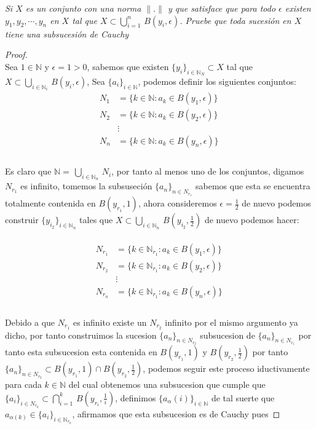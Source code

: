 \documentclass[11pt,letterpaper]{article}
\newcommand{\N}{\mathbb{N}}
\begin{document}
\begin{tcolorbox}[
	title = \textcolor{black}{\textcolor{white}{Problema 3}},]
\textit{Si $X$ es un conjunto con una norma $\|.\|$ y que satisface que para todo $\epsilon$ existen $y_1,y_2,\cdots, y_n$
en $X$ tal que $X\subset \displaystyle\bigcup_{i=1}^{n}\,B(y_i,\epsilon)$. Pruebe que toda sucesi\'on en $X$ tiene una subsucesi\'on de Cauchy}
\end{tcolorbox}
\begin{proof}\,\\
    Sea $1\in \N$ y $\epsilon=1>0$, sabemos que existen $\{y_i\}_{i\in \N_N}\subset X$ tal que $X\subset\displaystyle\bigcup_{i\in \N_i}\,B(y_i,\epsilon)$, Sea
    $\{a_i\}_{i\in \N}$, podemos definir los siguientes conjuntos:\,\\
    \begin{align*}
        N_{1}&=\{k \in \N:a_k\in B(y_1,\epsilon)\}\,\\
        N_{2}&=\{k\in \N:a_k\in B(y_2,\epsilon)\}\,\\
        &\vdots\,\\
        N_{n}&=\{k \in \N:a_k\in B(y_n,\epsilon)\}\,\\
    \end{align*}\,\\
    Es claro que $\N=\displaystyle\,\bigcup_{i\in \N_n}\,N_i$, por tanto al menos uno de los conjuntos, digamos $N_{r_1}$ es infinito, tomemos la subsuseci\'on $\{a_n\}_{n\in N_{r_1}}$ sabemos que esta se encuentra totalmente contenida en $B(y_{r_1},1)$, ahora consideremos $\epsilon=\frac{1}{2}$ de nuevo podemos construir $\{y_{i_2}\}_{i\in \N_n}$ tales que $X\subset \displaystyle \bigcup_{i\in \N_n}\,B\left(y_{i_2},\frac{1}{2}\right)$ de nuevo podemos hacer:\,\\
    \,\\
     \begin{align*}
        N_{r_1}&=\{k \in \N_{r_1}:a_k\in B(y_1,\epsilon)\}\,\\
        N_{r_2}&=\{k\in \N_{r_1}:a_k\in B(y_2,\epsilon)\}\,\\
        &\vdots\,\\
        N_{r_n}&=\{k \in \N_{r_1}:a_k\in B(y_n,\epsilon)\}\,\\
    \end{align*}\,\\
    Debido a que $N_{r_1}$ es infinito existe un $N_{r_2}$ infinito por el mismo argumento ya dicho, por tanto construimos la sucesion $\{a_n\}_{n\in N_{r_2}}$ subsucesion de $\{a_n\}_{n\in N_{r_1}}$ por tanto esta subsucesion esta contenida en $B(y_{r_1},1)$ y $B\left(y_{r_2},\frac{1}{2}\right)$ por tanto $\{a_n\}_{n\in N_{r_2}}\subset B(y_{r_1},1)\cap B\left(y_{r_2},\frac{1}{2}\right)$, podemos seguir este proceso iductivamente para cada $k\in \N$ del cual obtenemos una subsucesion que cumple que $\{a_{i}\}_{i\in N_{r_k}}\subset\bigcap_{i=1}^{k}\,B\left(y_{r_i},\frac{1}{i}\right)$, definimos $\{a_\alpha(i)\}_{i\in\N }$ de tal suerte que $a_{\alpha(k)}\in \{a_{i}\}_{i\in \N_{r_k}}$, afirmamos que esta subsucesion es de Cauchy pues

\end{proof}
\end{document}
